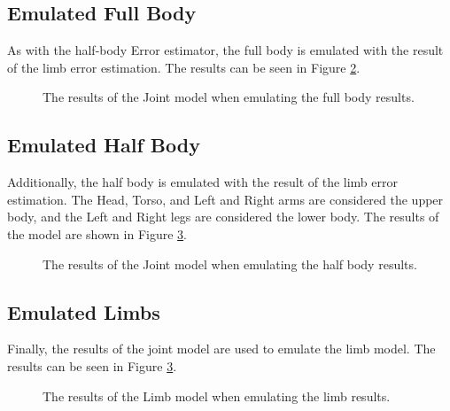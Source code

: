 \subsection{Emulated Full Body}

As with the half-body Error estimator, the full body is emulated with the result of the limb error estimation. The results can be seen in Figure \ref{fig:joints_emulated_full_body}. 

\begin{figure}
    \centering
    \caption[Joint model with emulated Full Body results]{The results of the Joint model when emulating the full body results.}
    \label{fig:joints_emulated_full_body}
\end{figure}
  
\subsection{Emulated Half Body}

Additionally, the half body is emulated with the result of the limb error estimation. The Head, Torso, and Left and Right arms are considered the upper body, and the Left and Right legs are considered the lower body. The results of the model are shown in Figure \ref{fig:joints_emulated_half_body}.

\begin{figure}
    \centering
    \caption[Joint model with emulated Half Body results]{The results of the Joint model when emulating the half body results.}
    \label{fig:joints_emulated_full_body}
\end{figure}

\subsection{Emulated Limbs}

Finally, the results of the joint model are used to emulate the limb model. The results can be seen in Figure \ref{fig:joints_emulated_half_body}.

\begin{figure}
    \centering
    \caption[joint model with emulated Limb results]{The results of the Limb model when emulating the limb results.}
    \label{fig:joints_emulated_half_body}
\end{figure}